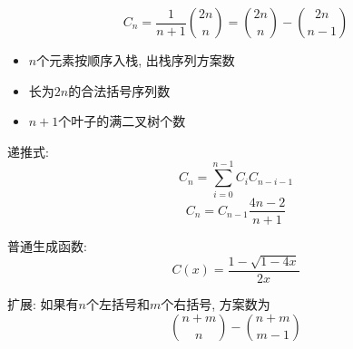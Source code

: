 $$C_n = \frac 1 {n + 1}{2n\choose n} = {2n \choose n} - {2n \choose n - 1}$$

\begin{itemize}
	\item $n$个元素按顺序入栈, 出栈序列方案数
	\item 长为$2n$的合法括号序列数
	\item $n + 1$个叶子的满二叉树个数
\end{itemize}

递推式: 
$$C_n = \sum_{i = 0} ^ {n - 1} C_i C_{n - i - 1}$$
$$C_n = C_{n - 1} \frac {4n - 2} {n + 1}$$

普通生成函数:
$$C(x) = \frac {1 - \sqrt {1 - 4 x}} {2 x}$$

扩展: 如果有$n$个左括号和$m$个右括号, 方案数为
$${n + m \choose n} - {n + m \choose m - 1}$$